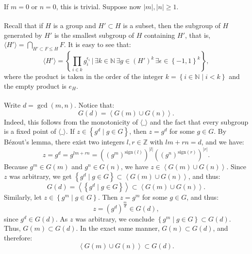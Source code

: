 \begin{solution}
    If \( m=0 \) or \( n=0 \), this is trivial. Suppose now \( |m|,|n|\geq 1 \).
    \\\\
    Recall that if \( H \) is a group and \( H'\subset H \) is a subset, then the subgroup of \( H \) generated by \( H' \) is the smallest subgroup of \( H \) containing \( H' \), that is, \( \langle H'\rangle=\bigcap_{H'\subset F\leq H}F \). It is easy to see that:
    \begin{equation}\label{1}
        \langle H'\rangle=\left\{\prod_{i\in k}g_i^{\epsilon_i} \,\Bigg|\, \exists k\in\mathbb{N}\, \exists g\in \left(H'\right)^k\, \exists \epsilon\in\left\{-1,1\right\}^{k}\right\},
    \end{equation}
    where the product is taken in the order of the integer \( k=\left\{i\in\mathbb{N} \mid i<k\right\} \) and the empty product is \( e_H \).
    \\\\
    Write \( d = \gcd\left(m, n\right) \). Notice that:
    \[
        G\left(d\right)=\left\langle G\left(m\right)\cup G\left(n\right) \right\rangle.
    \]
    Indeed, this follows from the monotonicity of \( \langle\_\rangle \) and the fact that every subgroup is a fixed point of \( \langle\_\rangle \). If \( z\in\left\{g^d \mid g\in G\right\} \), then \( z=g^d \) for some \( g\in G \). By Bézout's lemma, there exist two integers \( l,r\in\mathbb{Z} \) with \( lm+rn=d \), and we have:
    \[
        z=g^d=g^{lm+rn}=\left(\left(g^m\right)^{\mathrm{sign}\left(l\right)}\right)^{|l|}\left(\left(g^n\right)^{\mathrm{sign}\left(r\right)}\right)^{|r|}.
    \]
    Because \( g^m\in G\left(m\right) \) and \( g^n\in G\left(n\right) \), we have \( z\in\left\langle G\left(m\right)\cup G\left(n\right) \right\rangle \). Since \( z \) was arbitrary, we get \( \left\{g^d \mid g\in G\right\}\subset\left\langle G\left(m\right)\cup G\left(n\right)\right\rangle \), and thus:
    \[
        G\left(d\right)=\left\langle\left\{g^d \mid g\in G\right\}\right\rangle\subset \left\langle G\left(m\right)\cup G\left(n\right)\right\rangle.
    \]
    Similarly, let \( z\in \left\{g^m \mid g\in G\right\} \). Then \( z=g^m \) for some \( g\in G \), and thus:
    \[
        z=\left(g^{d}\right)^{\frac{m}{d}}\in G\left(d\right),
    \]
    since \( g^d\in G\left(d\right) \). As \( z \) was arbitrary, we conclude \( \left\{g^m \mid g\in G\right\}\subset G\left(d\right) \). Thus, \( G\left(m\right)\subset G\left(d\right) \). In the exact same manner, \( G\left(n\right)\subset G\left(d\right) \), and therefore:
    \[
        \left\langle G\left(m\right)\cup G\left(n\right)\right\rangle\subset G\left(d\right).
\]
\end{solution}
